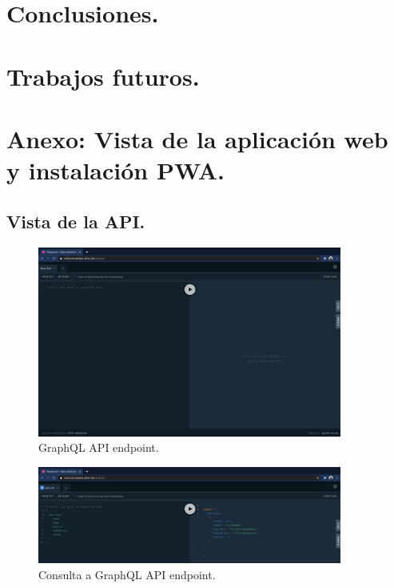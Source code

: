 \section{Conclusiones.}

\newpage

\section{Trabajos futuros.}

\section{Anexo: Vista de la aplicación web y instalación PWA.}

\subsection{Vista de la API.}

\begin{figure}[ht!]
  \centering
  \includegraphics[width=10cm]{imagenes/desarrollo/web/api/graphql_api}
  \caption{GraphQL API endpoint.}
  \label{fig:graphql-api}
\end{figure}

\begin{figure}[ht!]
  \centering
  \includegraphics[width=10cm]{imagenes/desarrollo/web/api/graphql_query}
  \caption{Consulta a GraphQL API endpoint.}
  \label{fig:query-graphql-api}
\end{figure}

